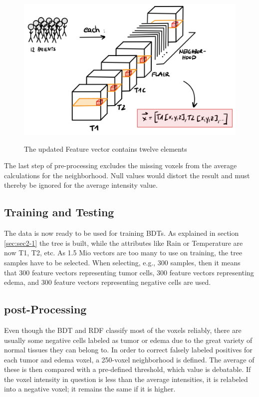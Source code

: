 \documentclass[
12pt,
headsepline,
bibliography=totoc,
twoside=semi,
fleqn
]{scrartcl}
\begin{document}
 \begin{figure}[H]
 \centering \includegraphics[scale=0.6]{BDT15.png}\label{fig:fig15}
 \caption{The updated Feature vector contains twelve elements}
 \end{figure}



 The last step of pre-processing excludes the missing voxels from the average calculations for the neighborhood. Null values would distort the result and must thereby be ignored for the average intensity value. 

 \subsection{Training and Testing\label{sec:sec3-3}}
 The data is now ready to be used for training BDTs. As explained in section \ref{sec:sec2-1} the tree is built, while the attributes like Rain or Temperature are now T1, T2, etc. As 1.5 Mio vectors are too many to use on training, the tree samples have to be selected. When selecting, e.g., 300 samples, then it means that 300 feature vectors representing tumor cells, 300 feature vectors representing edema, and 300 feature vectors representing negative cells are used. 
 
 \subsection{post-Processing\label{sec:sec3-4}}
 Even though the BDT and RDF classify most of the voxels reliably, there are usually some negative cells labeled as tumor or edema due to the great variety of normal tissues they can belong to. In order to correct falsely labeled positives for each tumor and edema voxel, a 250-voxel neighborhood is defined. The average of these is then compared with a pre-defined threshold, which value is debatable. If the voxel intensity in question is less than the average intensities, it is relabeled into a negative voxel; it remains the same if it is higher.
\end{document}

